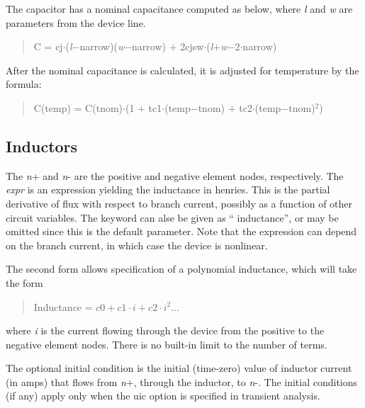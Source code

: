 The capacitor has a nominal capacitance computed as below, where {\it
l} and {\it w} are parameters from the device line.
\begin{quote}
C = {\vt cj}$\cdot$({\it l\/}$-${\vt narrow})({\it w\/}$-${\vt narrow}) $+$
  2{\vt cjsw}$\cdot$({\it l\/}$+${\it w\/}$-$2$\cdot${\vt narrow})
\end{quote}

After the nominal capacitance is calculated, it is adjusted for
temperature by the formula:
\begin{quote}
C{\vt (temp)} = C{\vt (tnom)}$\cdot${\vt (1 $+$ tc1$\cdot$(temp$-$tnom) $+$
 tc2$\cdot$(temp$-$tnom)$^2$)}
\end{quote}


\subsection{Inductors}



The {\it n\/}{\vt +} and {\it n\/}{\vt -} are the positive and
negative element nodes, respectively.  The {\it expr} is an expression
yielding the inductance in henries.  This is the partial derivative of
flux with respect to branch current, possibly as a function of other
circuit variables.  The keyword can alse be given as ``{\vt
inductance}'', or may be omitted since this is the default parameter. 
Note that the expression can depend on the branch current, in which
case the device is nonlinear.

The second form allows specification of a polynomial inductance, which
will take the form
\begin{quote}
Inductance = $c0 + c1{\cdot}i + c2{\cdot}i^2 ...$
\end{quote}
where {\it i} is the current flowing through the device from the
positive to the negative element nodes.  There is no built-in limit to
the number of terms.

The optional initial condition is the initial (time-zero) value of
inductor current (in amps) that flows from {\it n\/}{\vt +}, through
the inductor, to {\it n\/}{\vt -}.  The initial conditions (if any)
apply only when the {\vt uic} option is specified in transient
analysis.



